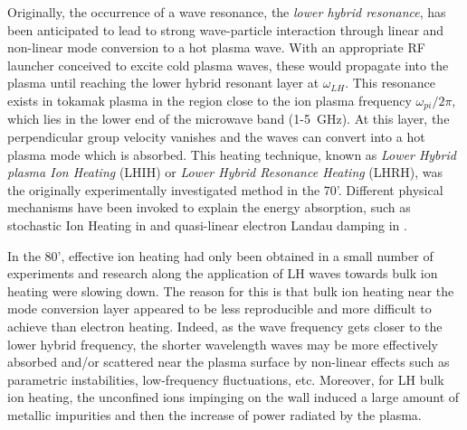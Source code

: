 Originally, the occurrence of a wave resonance, the \emph{lower hybrid resonance}, has been anticipated to lead to strong wave-particle interaction through linear and non-linear mode conversion to a hot plasma wave. With an appropriate RF launcher conceived to excite cold plasma waves, these would propagate into the plasma until reaching the lower hybrid resonant layer at $\omega_{LH}$. This resonance exists in tokamak plasma in the region close to the ion plasma frequency $\omega_{pi}/2\pi$, which lies in the lower end of the microwave band (1-5~GHz). At this layer, the perpendicular group velocity vanishes and the waves can convert into a hot plasma mode which is absorbed. This heating technique, known as \emph{Lower Hybrid plasma Ion Heating} (LHIH) or \emph{Lower Hybrid Resonance Heating} (LHRH), was the originally experimentally investigated method in the 70'. Different physical mechanisms have been invoked to explain the energy absorption, such as stochastic Ion Heating in  and quasi-linear electron Landau damping in .


In the 80', effective ion heating had only been obtained in a small number of experiments and research along the application of LH waves towards bulk ion heating were slowing down. The reason for this is that bulk ion heating near the mode conversion layer appeared to be less reproducible and more difficult to achieve than electron heating. Indeed, as the wave frequency gets closer to the lower hybrid frequency, the shorter wavelength waves may be more effectively absorbed and/or scattered near the plasma surface by non-linear effects such as parametric instabilities, low-frequency fluctuations, etc. Moreover, for LH bulk ion heating, the unconfined ions impinging on the wall induced a large amount of metallic impurities and then the increase of power radiated by the plasma.

